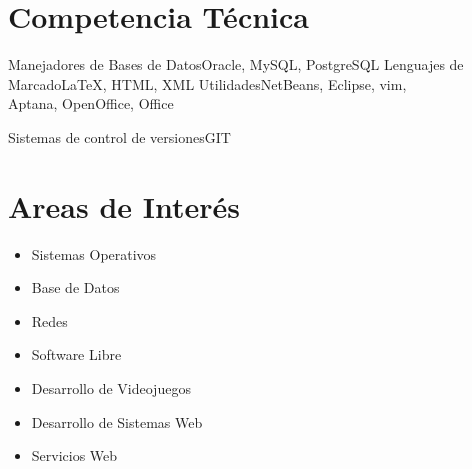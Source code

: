 \documentclass[10pt,a4paper]{moderncv}
\begin{document}
\section{Competencia T\'ecnica}
				{Manejadores de Bases de Datos}{Oracle, MySQL, PostgreSQL}
				{Lenguajes de Marcado}{LaTeX, HTML, XML}
				{Utilidades}{NetBeans, Eclipse, vim, \\ Aptana, OpenOffice, Office}	

				{Sistemas de control de versiones}{GIT}	


\section{Areas de Inter\'es}
	\begin{itemize}
		\item{Sistemas Operativos} 
		\item{Base de Datos} 
		\item{Redes}
		\item{Software Libre} 
    \item{Desarrollo de Videojuegos}
    \item{Desarrollo de Sistemas Web}
    \item{Servicios Web}
	\end{itemize}
\end{document}
